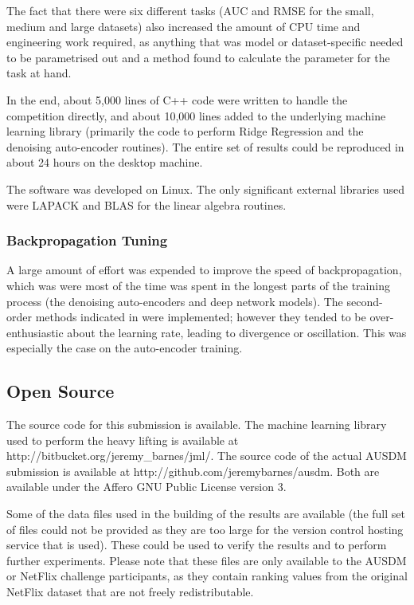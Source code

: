 \documentclass{article}
\begin{document}
The fact that there were six different tasks (AUC and RMSE for the small, medium and large datasets) also increased the amount of CPU time and engineering work required, as anything that was model or dataset-specific needed to be parametrised out and a method found to calculate the parameter for the task at hand.

In the end, about 5,000 lines of C++ code were written to handle the competition directly, and about 10,000 lines added to the underlying machine learning library (primarily the code to perform Ridge Regression and the denoising auto-encoder routines).  The entire set of results could be reproduced in about 24 hours on the desktop machine.

The software was developed on Linux.  The only significant external libraries used were LAPACK and BLAS for the linear algebra routines.

\subsubsection{Backpropagation Tuning}

A large amount of effort was expended to improve the speed of backpropagation, which was were most of the time was spent in the longest parts of the training process (the denoising auto-encoders and deep network models).  The second-order methods indicated in \cite{lecun-98b} were implemented; however they tended to be over-enthusiastic about the learning rate, leading to divergence or oscillation.  This was especially the case on the auto-encoder training.

\subsection{Open Source}

The source code for this submission is available.  The machine learning library used to perform the heavy lifting is available at http://bitbucket.org/jeremy\_barnes/jml/.  The source code of the actual AUSDM submission is available at http://github.com/jeremybarnes/ausdm.  Both are available under the Affero GNU Public License version 3.

Some of the data files used in the building of the results are available (the full set of files could not be provided as they are too large for the version control hosting service that is used).  These could be used to verify the results and to perform further experiments.  Please note that these files are only available to the AUSDM or NetFlix challenge participants, as they contain ranking values from the original NetFlix dataset that are not freely redistributable.
\end{document}
